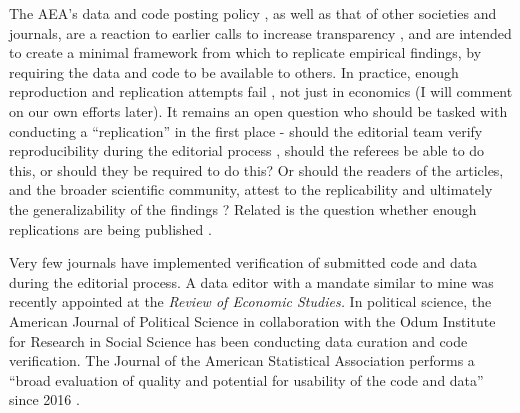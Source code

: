 \documentclass[PP]{AEA}
\begin{document}
The \ac{AEA}'s data and code posting policy \citep{American_Economic_Association2008-az}, as well as that of other societies and journals, are a reaction to earlier calls to increase transparency \citep{McCullough2006-cz,AndersonJ.Econ.Methodol.2008}, and are intended to create a minimal framework from which to replicate empirical findings, by requiring the data and code to be available to others. In practice, enough reproduction and replication attempts fail \citep{CamererScience2016,Chang2015-dl,ChangAm.Econ.Rev.2017}, not just in economics \citep{Baker2015-sh,Collaboration2015-ev} (I will comment on our own efforts later). It remains an open question who should be tasked with conducting a ``replication'' in the first place - should the editorial team verify reproducibility during the editorial process \citep{JacobyInsideHigherEd2017}, should the referees be able to do this, or should they be required to do this? Or should the readers of the articles, and the broader scientific community, attest to the replicability and ultimately the generalizability of the findings \citep{Hamermesh2017-kq}? Related is the question whether  enough replications are being published \citep{BerryAm.Econ.Rev.2017,Burman2010-ng,Coffman2017-si,Duvendack2017-js,Hoffler-LibMag.2017}.

Very few journals have implemented verification of submitted code and data during the editorial process. A data editor with a mandate similar to mine was recently appointed at the \textit{Review of Economic Studies.}   In political science, the American Journal of Political Science in collaboration with the Odum Institute for Research in Social Science \citep{ChristianInt.J.Digit.Curation2018} has been conducting data curation and code verification. The Journal of the American Statistical Association performs a ``broad evaluation of quality and potential for usability of the code and data'' since 2016 \citep{Stodden2016-uc}.

\end{document}
